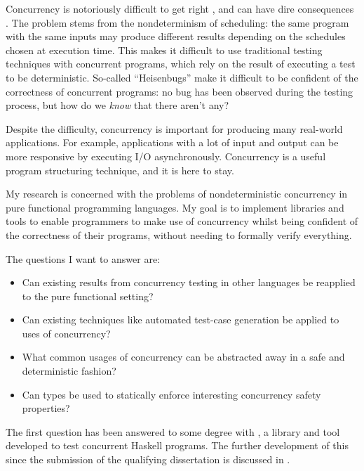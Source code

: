 Concurrency is notoriously difficult to get right \citep{overrated},
and can have dire consequences \citep{therac25}. The problem stems
from the nondeterminism of scheduling: the same program with the same
inputs may produce different results depending on the schedules chosen
at execution time. This makes it difficult to use traditional testing
techniques with concurrent programs, which rely on the result of
executing a test to be deterministic. So-called ``Heisenbugs'' make it
difficult to be confident of the correctness of concurrent programs:
no bug has been observed during the testing process, but how do we
\emph{know} that there aren't any?

Despite the difficulty, concurrency is important for producing many
real-world applications. For example, applications with a lot of input
and output can be more responsive by executing I/O asynchronously.
Concurrency is a useful program structuring technique, and it is here
to stay.

My research is concerned with the problems of nondeterministic
concurrency in pure functional programming languages. My goal is to
implement libraries and tools to enable programmers to make use of
concurrency whilst being confident of the correctness of their
programs, without needing to formally verify everything.

The questions I want to answer are:

\begin{itemize}
\item Can existing results from concurrency testing in other languages
  be reapplied to the pure functional setting?

\item Can existing techniques like automated test-case generation be
  applied to uses of concurrency?

\item What common usages of concurrency can be abstracted away in a
  safe and deterministic fashion?

\item Can types be used to statically enforce interesting concurrency
  safety properties?
\end{itemize}

The first question has been answered to some degree with \dejafu{}
\citep{dejafu}, a library and tool developed to test concurrent
Haskell programs. The further development of this since the submission
of the qualifying dissertation is discussed in .
